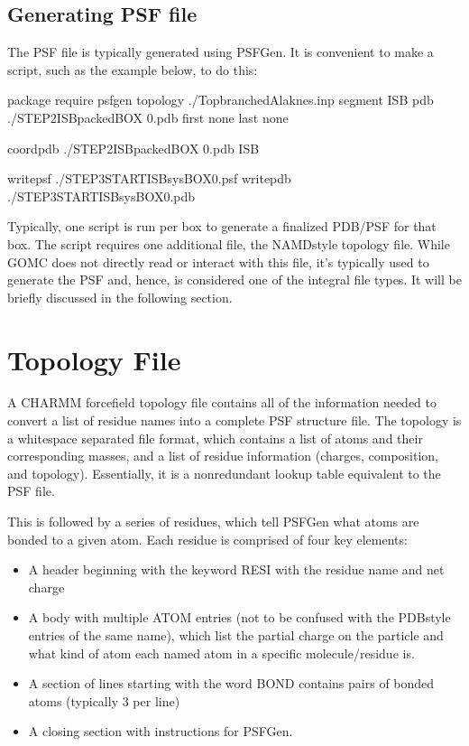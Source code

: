 \documentclass[letterpaper,10pt,english]{sphinxmanual}
\begin{document}
\subsection{Generating PSF file}
\label{\detokenize{input_file:generating-psf-file}}
The PSF file is typically generated using PSFGen. It is convenient to make a script, such as the example below, to do this:

\begin{sphinxVerbatim}[commandchars=\\\{\}]
package require psfgen
topology  ./Top\PYGZus{}branched\PYGZus{}Alaknes.inp
segment ISB \PYGZob{}
  pdb   ./STEP2\PYGZus{}ISB\PYGZus{}packed\PYGZus{}BOX 0.pdb
  first   none
  last  none
\PYGZcb{}

coordpdb ./STEP2\PYGZus{}ISB\PYGZus{}packed\PYGZus{}BOX 0.pdb ISB

writepsf ./STEP3\PYGZus{}START\PYGZus{}ISB\PYGZus{}sys\PYGZus{}BOX\PYGZus{}0.psf
writepdb ./STEP3\PYGZus{}START\PYGZus{}ISB\PYGZus{}sys\PYGZus{}BOX\PYGZus{}0.pdb
\end{sphinxVerbatim}

Typically, one script is run per box to generate a finalized PDB/PSF for that box. The script requires one additional file, the NAMD\sphinxhyphen{}style topology file. While GOMC does not directly read or interact with this file, it’s typically used to generate the PSF and, hence, is considered one of the integral file types. It will be briefly discussed in the following section.


\section{Topology File}
\label{\detokenize{input_file:topology-file}}
A CHARMM forcefield topology file contains all of the information needed to convert a list of residue names into a complete PSF structure file. The topology is a whitespace separated file format, which contains a list of atoms and their corresponding masses, and a list of residue information (charges, composition, and topology). Essentially, it is a non\sphinxhyphen{}redundant lookup table equivalent to the PSF file.

This is followed by a series of residues, which tell PSFGen what atoms are bonded to a given atom. Each residue is comprised of four key elements:
\begin{itemize}
\item {} 
A header beginning with the keyword RESI with the residue name and net charge

\item {} 
A body with multiple ATOM entries (not to be confused with the PDB\sphinxhyphen{}style entries of the same name), which list the partial charge on the particle and what kind of atom each named atom in a specific molecule/residue is.

\item {} 
A section of lines starting with the word BOND contains pairs of bonded atoms (typically 3 per line)

\item {} 
A closing section with instructions for PSFGen.

\end{itemize}
\end{document}
